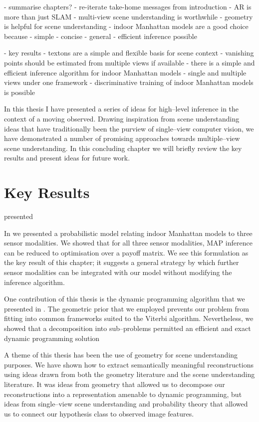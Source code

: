 - summarise chapters?
- re-iterate take-home messages from introduction
  - AR is more than just SLAM
  - multi-view scene understanding is worthwhile
  - geometry is helpful for scene understanding
  - indoor Manhattan models are a good choice because
    - simple
    - concise
    - general
    - efficient inference possible

- key results
  - textons are a simple and flexible basis for scene context
  - vanishing points should be estimated from multiple views if available
  - there is a simple and efficient inference algorithm for indoor Manhattan models
  - single and multiple views under one framework
  - discriminative training of indoor Manhattan models is possible


In this thesis I have presented a series of ideas for high--level
inference in the context of a moving observed. Drawing inspiration
from scene understanding ideas that have traditionally been the
purview of single--view computer vision, we have demonstrated a number
of promising approaches towards multiple--view scene understanding. In
this concluding chapter we will briefly review the key results and
present ideas for future work.

\section{Key Results}

 presented 

In  we presented a probabilistic model relating indoor
Manhattan models to three sensor modalities. We showed that for all
three sensor modalities, MAP inference can be reduced to optimisation
over a payoff matrix. We see this formulation as the key result of
this chapter; it suggests a general strategy by which further sensor
modalities can be integrated with our model without modifying the
inference algorithm.

One contribution of this thesis is the dynamic programming algorithm
that we presented in . The geometric prior that we
employed prevents our problem from fitting into common frameworks
suited to the Viterbi algorithm. Nevertheless, we showed that a
decomposition into sub--problems permitted an efficient and exact
dynamic programming solution

A theme of this thesis has been the use of geometry for scene
understanding purposes. We have shown how to extract semantically
meaningful reconstructions using ideas drawn from both the geometry
literature and the scene understanding literature. It was ideas from
geometry that allowed us to decompose our reconstructions into a
representation amenable to dynamic programming, but ideas from
single--view scene understanding and probability theory that allowed
us to connect our hypothesis class to observed image features.

